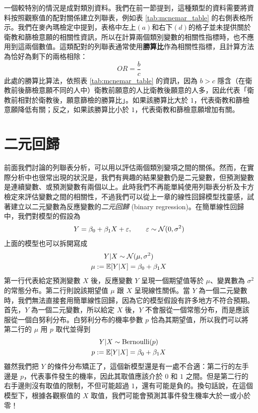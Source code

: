     一個較特別的情況是成對類別資料。我們在前一節提到，這種類型的資料需要將資料按照觀察值的配對關係建立列聯表，例如表 \ref{tab:mcnemar_table} 的右側表格所示。我們在麥內瑪檢定中提到，表格中左上$(a)$和右下$(d)$的格子並未提供關於衛教和篩檢意願的相關性資訊，所以在計算兩個類別變數的相關性指標時，也不應用到這兩個數值。這類配對的列聯表通常使用\textbf{勝算比}作為相關性指標，且計算方法為恰好為剩下的兩格相除：
    \[OR = \frac{b}{c}\]
    此處的勝算比算法，依照表 \ref{tab:mcnemar_table} 的資訊，因為 $b>c$ 隱含（在衛教前後篩檢意願不同的人中）衛教前願意的人比衛教後願意的人多，因此代表「衛教前相對於衛教後，願意篩檢的勝算比」。如果該勝算比大於 $1$，代表衛教和篩檢意願降低有關；反之，如果該勝算比小於 $1$，代表衛教和篩檢意願增加有關。

\section{二元回歸}

    前面我們討論的列聯表分析，可以用以評估兩個類別變項之間的關係。然而，在實際分析中也很常出現的狀況是，我們有興趣的結果變數仍是二元變數，但預測變數是連續變數、或預測變數有兩個以上。此時我們不再能單純使用列聯表分析及卡方檢定來評估變數之間的相關性，不過我們可以從上一章的線性回歸模型找靈感，試著建立以二元變數為反應變數的\textit{二元回歸} (binary regression)。在簡單線性回歸中，我們對模型的假設為
    \[Y = \beta_0 + \beta_1 X + \varepsilon, \qquad \varepsilon \sim \mathcal{N}(0,\sigma^2)\]
    上面的模型也可以拆開寫成
    \begin{gather*}
        Y|X \sim \mathcal{N}(\mu, \sigma^2)\\
        \mu := \mathbb{E}[Y|X] = \beta_0 + \beta_1 X
    \end{gather*}
    第一行代表給定預測變數 $X$ 後，反應變數 $Y$ 呈現一個期望值等於 $\mu$、變異數為 $\sigma^2$ 的常態分布。第二行則說該期望值 $\mu$ 跟 $X$ 呈現線性關係。當 $Y$ 為一個二元變數時，我們無法直接套用簡單線性回歸，因為它的模型假設有許多地方不符合預期。首先，$Y$ 為一個二元變數，所以給定 $X$ 後，$Y$ 不會服從一個常態分布，而是應該服從一個白努利分布。白努利分布的機率參數 $p$ 恰為其期望值，所以我們可以將第二行的 $\mu$ 用 $p$ 取代並得到
    \begin{gather*}
        Y|X \sim \text{Bernoulli}(p)\\
        p := \mathbb{E}[Y|X] = \beta_0 + \beta_1 X
    \end{gather*}
    雖然我們把 $Y$ 的條件分布矯正了，這個新模型還是有一處不合適：第二行的左手邊是 $p$，代表事件發生的機率，因此其取值應該介於 $0$ 和 $1$ 之間。但是第二行的右手邊則沒有取值的限制，不但可能超過 $1$，還有可能是負的。換句話說，在這個模型下，根據各觀察值的 $X$ 取值，我們可能會預測其事件發生機率大於一或小於零！

